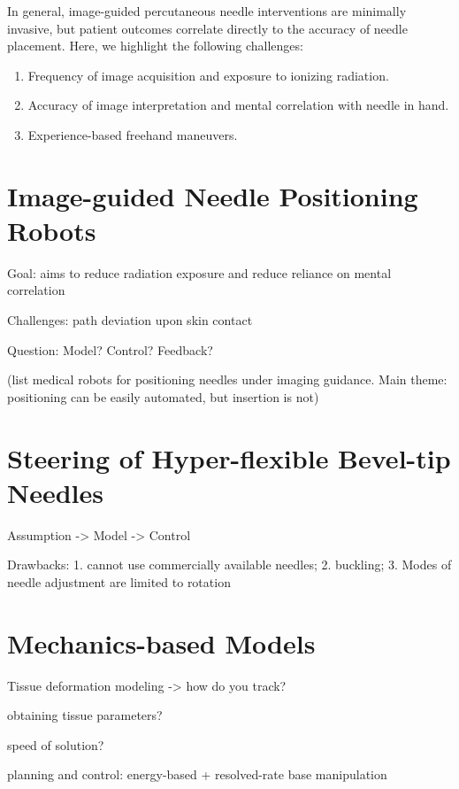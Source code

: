 In general, image-guided percutaneous needle interventions are minimally invasive, but patient outcomes correlate directly to the accuracy of needle placement. Here, we highlight the following challenges:
\begin{enumerate}
\item Frequency of image acquisition and exposure to ionizing radiation.
\item Accuracy of image interpretation and mental correlation with needle in hand.
\item Experience-based freehand maneuvers.
\end{enumerate}

\section{Image-guided Needle Positioning Robots}
\label{sec:image-guided-needle-positioning-robots}
\alert{Goal: aims to reduce radiation exposure and reduce reliance on mental correlation}

\alert{Challenges: path deviation upon skin contact}

\alert{Question: Model? Control? Feedback?}

\alert{(list medical robots for positioning needles under imaging guidance. Main theme: positioning can be easily automated, but insertion is not)}




\section{Steering of Hyper-flexible Bevel-tip Needles}
\label{sec:steering-of-hyperflexible-bevel-tip-needles}

\alert{Assumption -> Model -> Control}

\alert{Drawbacks: 1. cannot use commercially available needles; 2. buckling; 3. Modes of needle adjustment are limited to rotation}

\section{Mechanics-based Models}
\label{sec:mechanics-based-models}

\alert{Tissue deformation modeling -> how do you track?}

\alert{obtaining tissue parameters?}

\alert{speed of solution?}

\alert{planning and control: energy-based + resolved-rate base manipulation}

